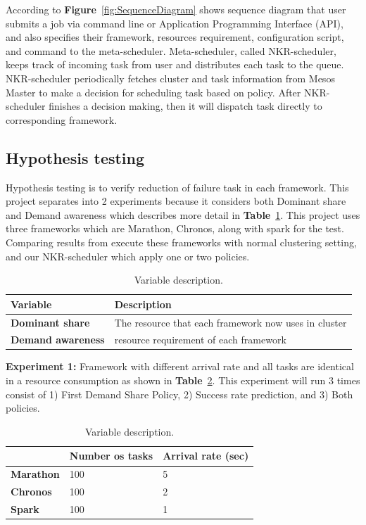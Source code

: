 \documentclass[12pt,oneside,openright,a4paper]{cpe-english-project}
\begin{document}
According to \textbf{Figure}~\ref{fig:SequenceDiagram} shows sequence diagram that user submits a job via command line or Application Programming Interface (API), and also specifies their framework, resources requirement, configuration script, and command to the meta-scheduler. Meta-scheduler, called NKR-scheduler, keeps track of incoming task from user and distributes each task to the queue. NKR-scheduler periodically fetches cluster and task information from Mesos Master to make a decision for scheduling task based on policy.  After NKR-scheduler finishes a decision making, then it will dispatch task directly to corresponding framework.

\subsection{Hypothesis testing} 
Hypothesis testing is to verify reduction of failure task in each framework. This project separates into 2 experiments because it considers both Dominant share and Demand awareness which describes more detail in \textbf{Table}~\ref{tbl:VariableDescription}. This project uses three frameworks which are Marathon, Chronos, along with spark for the test.  Comparing results from execute these frameworks with normal clustering setting, and our NKR-scheduler which apply one or two policies.

\begin{table}[!h]
  \caption{Variable description.}\label{tbl:VariableDescription}
  \begin{tabular}{|l|l|}
    \hline
    \textbf{Variable} & \textbf{Description}\\
    \hline
    \textbf{Dominant share} & The resource that each framework now uses in cluster\\
    \hline
    \textbf{Demand awareness} & resource requirement of each framework \\
    \hline
  \end{tabular}
\end{table}

\textbf{Experiment 1:} Framework with different arrival rate and all tasks are identical in a resource consumption as shown in \textbf{Table}~\ref{tbl:Experiment1}. This experiment will run 3 times consist of 1) First Demand Share Policy, 2) Success rate prediction, and 3) Both policies.

\begin{table}[!h]
  \caption{Variable description.}\label{tbl:Experiment1}
  \begin{tabular}{|l|l|l|}
    \hline
    & \textbf{Number os tasks} & \textbf{Arrival rate (sec)}\\
    \hline
    \textbf{Marathon} & 100 & 5\\
    \hline
    \textbf{Chronos} & 100 & 2 \\
    \hline
    \textbf{Spark} & 100 & 1 \\
    \hline
\end{tabular}
\end{table}
\end{document}
